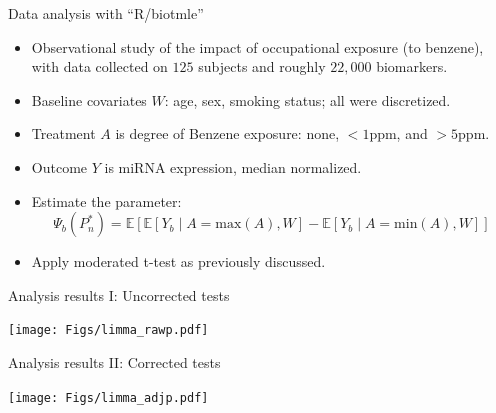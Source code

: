 \documentclass[12pt,t]{beamer}
\begin{document}
\begin{frame}[c]{Data analysis with ``R/biotmle''}

\begin{center}
\begin{itemize}
  \itemsep12pt
  \item Observational study of the impact of occupational exposure (to benzene),
    with data collected on $125$ subjects and roughly $22,000$ biomarkers.
  \item Baseline covariates $W$: age, sex, smoking status; all were discretized.
  \item Treatment $A$ is degree of Benzene exposure: none, $<1$ppm, and $>5$ppm.
  \item Outcome $Y$ is miRNA expression, median normalized.
  \item Estimate the parameter:
    \[
      \Psi_b(P_n^*) = \mathbb{E}[\mathbb{E}[Y_b \mid A = \text{max}(A), W] -
      \mathbb{E}[Y_b \mid A = \text{min}(A), W]]
    \]
  \item Apply moderated t-test as previously discussed.
\end{itemize}
\end{center}

\end{frame}



\begin{frame}[c]{Analysis results I: Uncorrected tests}

\begin{center}
  \texttt{[image: Figs/limma\_rawp.pdf]}
\end{center}

\end{frame}



\begin{frame}[c]{Analysis results II: Corrected tests}

\begin{center}
  \texttt{[image: Figs/limma\_adjp.pdf]}
\end{center}

\end{frame}
\end{document}
